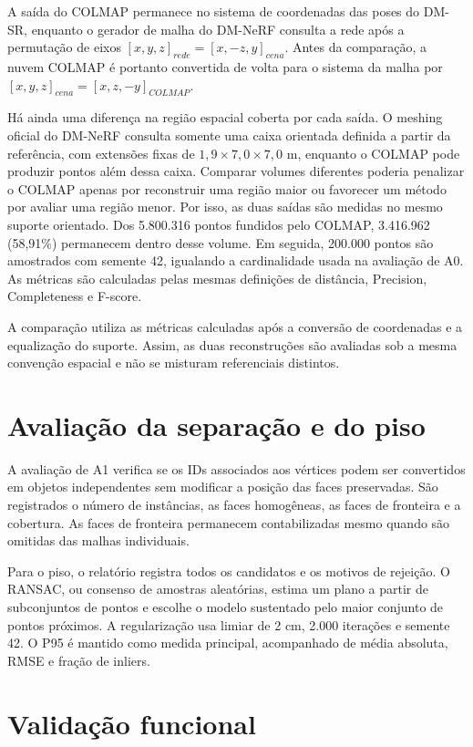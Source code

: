 A saída do COLMAP permanece no sistema de coordenadas das poses do DM-SR, enquanto o gerador de malha do DM-NeRF consulta a rede após a permutação de eixos \([x,y,z]_{rede}=[x,-z,y]_{cena}\). Antes da comparação, a nuvem COLMAP é portanto convertida de volta para o sistema da malha por \([x,y,z]_{cena}=[x,z,-y]_{COLMAP}\).

Há ainda uma diferença na região espacial coberta por cada saída. O meshing oficial do DM-NeRF consulta somente uma caixa orientada definida a partir da referência, com extensões fixas de \(1,9\times7,0\times7,0\) m, enquanto o COLMAP pode produzir pontos além dessa caixa. Comparar volumes diferentes poderia penalizar o COLMAP apenas por reconstruir uma região maior ou favorecer um método por avaliar uma região menor. Por isso, as duas saídas são medidas no mesmo suporte orientado. Dos 5.800.316 pontos fundidos pelo COLMAP, 3.416.962 (58,91\%) permanecem dentro desse volume. Em seguida, 200.000 pontos são amostrados com semente 42, igualando a cardinalidade usada na avaliação de A0. As métricas são calculadas pelas mesmas definições de distância, Precision, Completeness e F-score.

A comparação utiliza as métricas calculadas após a conversão de coordenadas e a equalização do suporte. Assim, as duas reconstruções são avaliadas sob a mesma convenção espacial e não se misturam referenciais distintos.

\section{Avaliação da separação e do piso}

A avaliação de A1 verifica se os IDs associados aos vértices podem ser convertidos em objetos independentes sem modificar a posição das faces preservadas. São registrados o número de instâncias, as faces homogêneas, as faces de fronteira e a cobertura. As faces de fronteira permanecem contabilizadas mesmo quando são omitidas das malhas individuais.

Para o piso, o relatório registra todos os candidatos e os motivos de rejeição. O RANSAC, ou consenso de amostras aleatórias, estima um plano a partir de subconjuntos de pontos e escolhe o modelo sustentado pelo maior conjunto de pontos próximos. A regularização usa limiar de 2 cm, 2.000 iterações e semente 42. O P95 é mantido como medida principal, acompanhado de média absoluta, RMSE e fração de inliers.

\section{Validação funcional}

